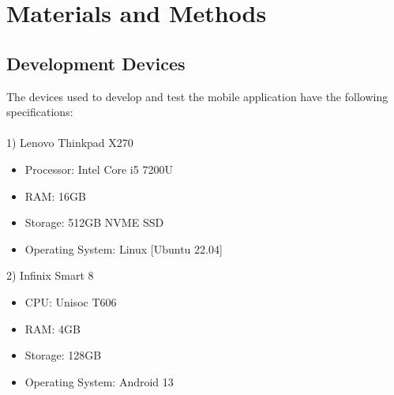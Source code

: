 \documentclass[journal]{./IEEE/IEEEtran}
\begin{document}

\section{Materials and Methods}

\subsection{Development Devices}

The devices used to develop and test the mobile application have the following specifications:\\\\
1) Lenovo Thinkpad X270
\begin{itemize}
  \item Processor: Intel Core i5 7200U
  \item RAM: 16GB
  \item Storage: 512GB NVME SSD
  \item Operating System: Linux [Ubuntu 22.04]
\end{itemize}
2) Infinix Smart 8
\begin{itemize}
  \item CPU: Unisoc T606
  \item RAM: 4GB
  \item Storage: 128GB
  \item Operating System: Android 13\\
\end{itemize}
\end{document}
